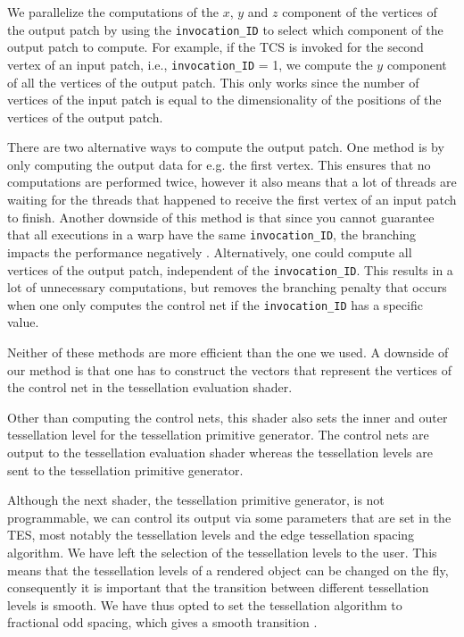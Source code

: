 		We parallelize the computations of the $x$, $y$ and $z$ component of the vertices of the output patch by using the \texttt{invocation\_ID} to select which component of the output patch to compute. For example, if the TCS is invoked for the second vertex of an input patch, i.e., \texttt{invocation\_ID} = 1, we compute the $y$ component of all the vertices of the output patch. This only works since the number of vertices of the input patch is equal to the dimensionality of the positions of the vertices of the output patch.

		There are two alternative ways to compute the output patch. One method is by only computing the output data for e.g. the first vertex. This ensures that no computations are performed twice, however it also means that a lot of threads are waiting for the threads that happened to receive the first vertex of an input patch to finish. Another downside of this method is that since you cannot guarantee that all executions in a warp have the same \texttt{invocation\_ID}, the branching impacts the performance negatively \cite{fung2007dynamic}.
		Alternatively, one could compute all vertices of the output patch, independent of the \texttt{invocation\_ID}. This results in a lot of unnecessary computations, but removes the branching penalty that occurs when one only computes the control net if the \texttt{invocation\_ID} has a specific value. 

		Neither of these methods are more efficient than the one we used. A downside of our method is that one has to construct the vectors that represent the vertices of the control net in the tessellation evaluation shader. 

		Other than computing the control nets, this shader also sets the inner and outer tessellation level for the tessellation primitive generator. 
		The control nets are output to the tessellation evaluation shader whereas the tessellation levels are sent to the tessellation primitive generator. 

		Although the next shader, the tessellation primitive generator, is not programmable, we can control its output via some parameters that are set in the TES, most notably the tessellation levels and the edge tessellation spacing algorithm. We have left the selection of the tessellation levels to the user. This means that the tessellation levels of a rendered object can be changed on the fly, consequently it is important that the transition between different tessellation levels is smooth. We have thus opted to set the tessellation algorithm to fractional odd spacing, which gives a smooth transition \cite{cozzi2012opengl}. 

